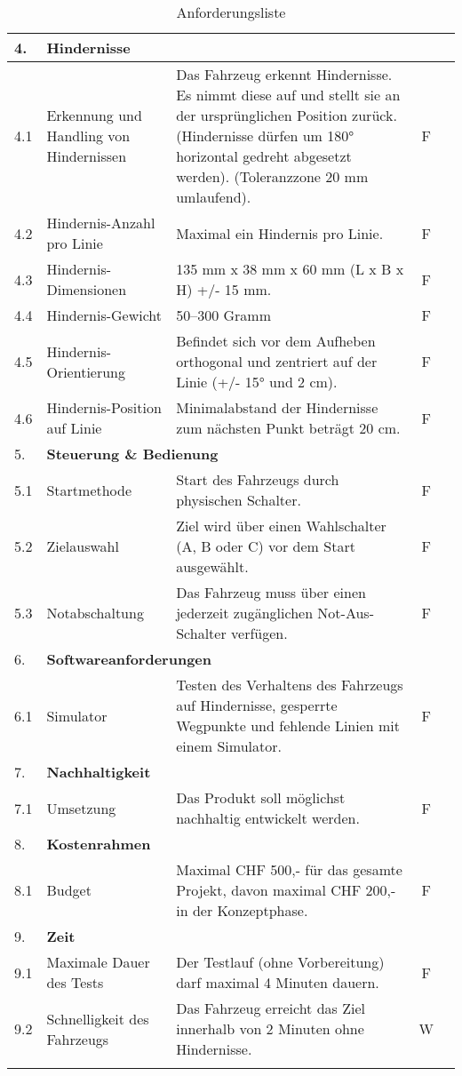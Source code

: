 \documentclass[../main.tex]{subfiles}
\begin{document}
\begin{longtable}[]{@{}lp{4.5cm}p{7.5cm}cc}
  4.  & \multicolumn{4}{l}{\textbf{Hindernisse}} \\ \hline
  4.1 & Erkennung und Handling von Hindernissen & Das Fahrzeug erkennt Hindernisse. Es nimmt diese auf und stellt sie an der ursprünglichen Position zurück. (Hindernisse dürfen um 180° horizontal gedreht abgesetzt werden). (Toleranzzone 20 mm umlaufend). & F\\ \hline
  4.2 & Hindernis-Anzahl pro Linie & Maximal ein Hindernis pro Linie. & F\\ \hline
  4.3 & Hindernis-Dimensionen & 135 mm x 38 mm x 60 mm (L x B x H) +/- 15 mm. & F  \\ \hline
  4.4 & Hindernis-Gewicht & 50–300 Gramm & F \\ \hline
  4.5 & Hindernis-Orientierung & Befindet sich vor dem Aufheben orthogonal und zentriert auf der Linie (+/- 15° und 2 cm). & F \\ \hline
  4.6 & Hindernis-Position auf Linie & Minimalabstand der Hindernisse zum nächsten Punkt beträgt 20 cm. & F \\ \hline

  5. & \multicolumn{4}{l}{\textbf{Steuerung \& Bedienung}} \\ \hline
  5.1 & Startmethode & Start des Fahrzeugs durch physischen Schalter. & F \\ \hline
  5.2 & Zielauswahl & Ziel wird über einen Wahlschalter (A, B oder C) vor dem Start ausgewählt. & F  \\ \hline
  5.3 & Notabschaltung & Das Fahrzeug muss über einen jederzeit zugänglichen Not-Aus-Schalter verfügen. & F  \\ \hline

  6.  & \multicolumn{4}{l}{\textbf{Softwareanforderungen}} \\ \hline
  \hypertarget{A6.1}{6.1} & Simulator & Testen des Verhaltens des Fahrzeugs auf Hindernisse, gesperrte Wegpunkte und fehlende Linien mit einem Simulator. & F  \\ \hline

  7.  & \multicolumn{4}{l}{\textbf{Nachhaltigkeit}} \\ \hline
  7.1 & Umsetzung & Das Produkt soll möglichst nachhaltig entwickelt werden. & F  \\ \hline

  8.  & \multicolumn{4}{l}{\textbf{Kostenrahmen}} \\ \hline
  8.1 & Budget & Maximal CHF 500,- für das gesamte Projekt, davon maximal CHF 200,- in der Konzeptphase. & F \\ \hline
  
  9.  & \multicolumn{4}{l}{\textbf{Zeit}} \\ \hline
  9.1 & Maximale Dauer des Tests & Der Testlauf (ohne Vorbereitung) darf maximal 4 Minuten dauern. & F \\ \hline
  9.2 & Schnelligkeit des Fahrzeugs & Das Fahrzeug erreicht das Ziel innerhalb von 2 Minuten ohne Hindernisse. & W  \\ \hline

\caption{Anforderungsliste}
\label{tab:Anforderungsliste}
\end{longtable}
\end{document}
